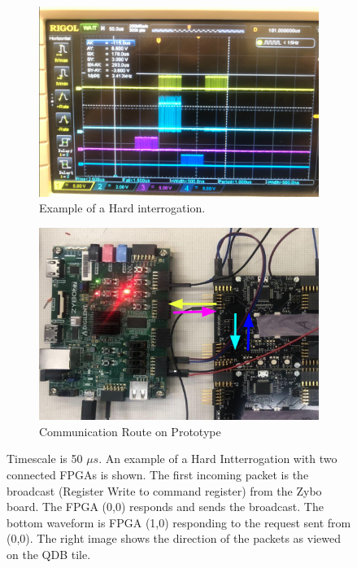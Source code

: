 \begin{figure}
\centering
\begin{subfigure}{0.475\textwidth}
  \centering
  \includegraphics[width=\textwidth]{images/qdb_example_packet_waveform.png}
  \caption{Example of a Hard interrogation.}
\end{subfigure}%
\begin{subfigure}{0.475\textwidth}
  \centering
  \includegraphics[width=\textwidth]{images/qdb_example_packet_waveform_diagram.png}
  \caption{Communication Route on Prototype}
\end{subfigure}
\caption{Timescale is 50 $\unit{\mu s}$.
An example of a Hard Intterrogation with two connected FPGAs is shown.
The first incoming packet is the broadcast (Register Write to command register) from the Zybo board.
The FPGA (0,0) responds and sends the broadcast.
The bottom waveform is FPGA (1,0) responding to the request sent from (0,0).
The right image shows the direction of the packets as viewed on the QDB tile.
}
\label{fig:example_broadcast}
\end{figure}

